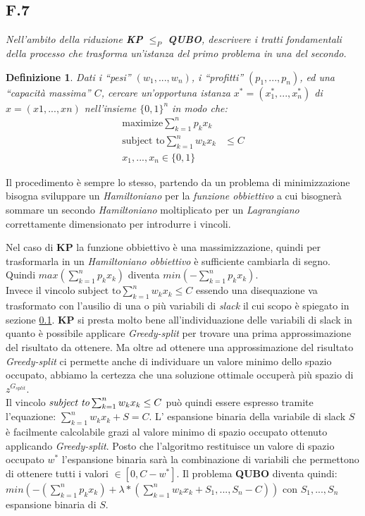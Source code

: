 \documentclass[a4paper]{article}
\newtheorem*{definition}{Definizione}
\begin{document}
\subsection{F.7}
\label{SEC:F6}
\emph{Nell’ambito della riduzione \textbf{KP} $\leq_P$ \textbf{QUBO}, descrivere i tratti fondamentali della processo che trasforma un'istanza del primo problema in una del secondo.}
\begin{definition} 
	Dati i “pesi” $(w_1, . . . , w_n)$, i “profitti” $(p_1, . . . , p_n)$, ed una “capacità massima” $C$, cercare un'opportuna istanza $x^* = (x^*_1, . . . , x^*_n)$ di $x = (x1, . . . , xn)$ nell'insieme  $\{0, 1\}^n$ in modo che:
\begin{align*}
        \text{maximize} \sum_{k=1}^n p_kx_k&\\
	\text{subject to} \sum_{k=1}^n w_kx_k&\leq C\\
x_1,...,x_n \in \{0,1\}&
\end{align*}
\end{definition}
Il procedimento è sempre lo stesso, partendo da un problema di minimizzazione bisogna sviluppare un \textit{Hamiltoniano} per la \textit{funzione obbiettivo} a cui bisognerà sommare un secondo \textit{Hamiltoniano} moltiplicato per un \textit{Lagrangiano} correttamente dimensionato per introdurre i vincoli.

Nel caso di \textbf{KP} la funzione obbiettivo è una massimizzazione, quindi per trasformarla in un \textit{Hamiltoniano obbiettivo} è sufficiente cambiarla di segno.
Quindi $max(\sum_{k=1}^{n} p_kx_k )$ diventa $min(-\sum_{k=1}^{n} p_kx_k )$.\\
Invece il vincolo $\text{subject to} \sum_{k=1}^n w_kx_k \leq C$ essendo una disequazione va trasformato con l'ausilio di una o più variabili di \textit{slack} il cui scopo è spiegato in sezione \ref{SEC:F6}.
\textbf{KP} si presta molto bene all'individuazione delle variabili di slack in quanto è possibile applicare \textit{Greedy-split} per trovare una prima approssimazione del risultato da ottenere.
Ma oltre ad ottenere una approssimazione del risultato \textit{Greedy-split} ci permette anche di individuare un valore minimo dello spazio occupato, abbiamo la certezza che una soluzione ottimale occuperà più spazio di $z^{G_{split}}$.\\
Il vincolo $\text{\textit{subject to}} \sum_{k=1}^n w_kx_k \leq C$ può quindi essere espresso tramite l'equazione: $\sum_{k=1}^n w_kx_k + S=C$.
L' espansione binaria della variabile di slack $S$ è facilmente calcolabile grazi al valore minimo di spazio occupato ottenuto applicando \textit{Greedy-split}.
Posto che l'algoritmo restituisce un valore di spazio occupato $w^*$ l'espansione binaria sarà la combinazione di variabili che permettono di ottenere tutti i valori $\in [0,C-w^*]$.
Il problema \textbf{QUBO} diventa quindi: $ min(-(\sum_{k=1}^n p_kx_k) + \lambda * (\sum_{k=1}^n w_kx_k + S_1,...,S_n - C)) $ con $S_1, ..., S_n$ espansione binaria di $S$.
\end{document}
